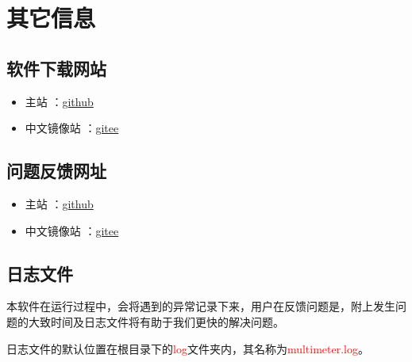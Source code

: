 \chapter{其它信息}

\section{软件下载网站}

\begin{itemize}
    \item 主站 ：\href{https://github.com/Joe-zhouman/multimeter-public/releases}{github}  
    \item 中文镜像站 ：\href{https://gitee.com/Joe-zhouman/multimeter-public/releases}{gitee}  
\end{itemize}

\section{问题反馈网址}

\begin{itemize}
    \item 主站 ：\href{https://github.com/Joe-zhouman/multimeter-public/issues}{github}  
    \item 中文镜像站 ：\href{https://gitee.com/Joe-zhouman/multimeter-public/issues}{gitee}  
\end{itemize}

\section{日志文件}
本软件在运行过程中，会将遇到的异常记录下来，用户在反馈问题是，附上发生问题的大致时间及日志文件将有助于我们更快的解决问题。

日志文件的默认位置在根目录下的\textcolor{red}{log}文件夹内，其名称为\textcolor{red}{multimeter.log}。